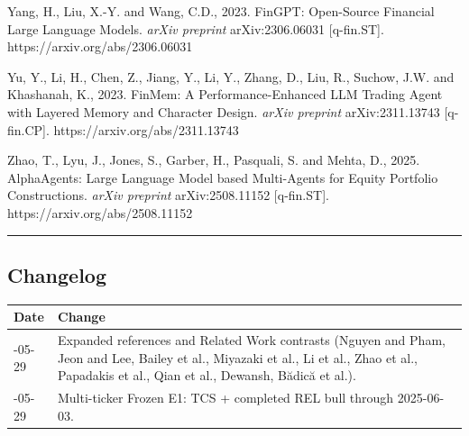 \documentclass[
]{article}
\newcounter{none} %
\begin{document}
Yang, H., Liu, X.-Y. and Wang, C.D., 2023. FinGPT: Open-Source Financial
Large Language Models. \emph{arXiv preprint} arXiv:2306.06031
{[}q-fin.ST{]}. https://arxiv.org/abs/2306.06031

Yu, Y., Li, H., Chen, Z., Jiang, Y., Li, Y., Zhang, D., Liu, R., Suchow,
J.W. and Khashanah, K., 2023. FinMem: A Performance-Enhanced LLM Trading
Agent with Layered Memory and Character Design. \emph{arXiv preprint}
arXiv:2311.13743 {[}q-fin.CP{]}. https://arxiv.org/abs/2311.13743

Zhao, T., Lyu, J., Jones, S., Garber, H., Pasquali, S. and Mehta, D.,
2025. AlphaAgents: Large Language Model based Multi-Agents for Equity
Portfolio Constructions. \emph{arXiv preprint} arXiv:2508.11152
{[}q-fin.ST{]}. https://arxiv.org/abs/2508.11152

\begin{center}\rule{0.5\linewidth}{0.5pt}\end{center}

\subsection{Changelog}\label{changelog}

{\def\LTcaptype{none} %
\begin{longtable}[]{@{}
  >{\raggedright\arraybackslash}p{}
  >{\raggedright\arraybackslash}p{}@{}}
\toprule\noalign{}
\begin{minipage}[b]{\linewidth}\raggedright
Date
\end{minipage} & \begin{minipage}[b]{\linewidth}\raggedright
Change
\end{minipage} \\
\midrule\noalign{}
\endhead
\bottomrule\noalign{}
\endlastfoot
2026-05-29 & Expanded references and Related Work contrasts (Nguyen and
Pham, Jeon and Lee, Bailey et al., Miyazaki et al., Li et al., Zhao et
al., Papadakis et al., Qian et al., Dewansh, Bădică et al.). \\
2026-05-29 & Multi-ticker Frozen E1: TCS + completed REL bull through
2025-06-03. \\
\end{longtable}
}
\end{document}

